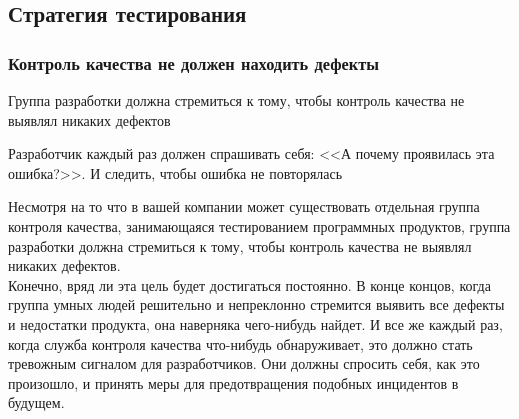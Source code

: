 \documentclass{../industrial-development}
\begin{document}
\subsection{Стратегия тестирования}
\begin{frame} \frametitle{Контроль качества не должен находить дефекты}
  \begin{block}{}
	Группа разработки должна стремиться к тому, чтобы контроль качества не выявлял никаких дефектов
  \end{block}
	Разработчик каждый раз должен спрашивать себя: <<А почему проявилась эта ошибка?>>. И следить, чтобы ошибка не повторялась
\end{frame}
\lecturenotes
Несмотря на то что в вашей компании может существовать отдельная группа контроля качества, занимающаяся тестированием программных продуктов, группа разработки должна стремиться к тому, чтобы контроль качества не выявлял никаких дефектов.\\
Конечно, вряд ли эта цель будет достигаться постоянно. В конце концов, когда группа умных людей решительно и непреклонно стремится выявить все дефекты и недостатки продукта, она наверняка чего-нибудь найдет. И все же каждый раз, когда служба контроля качества что-нибудь обнаруживает, это должно стать тревожным сигналом для разработчиков. Они должны спросить себя, как это произошло, и принять меры для предотвращения подобных инцидентов в будущем.
\end{document}
